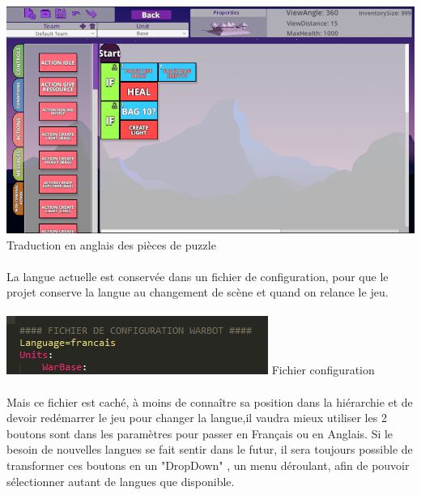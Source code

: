 \documentclass{report}
\begin{document}
\paragraph{}
\begin{center}
\includegraphics[scale=0.5]{DATA/piecetrad.png}
 {Traduction en anglais des pièces de puzzle}
\end{center}
\paragraph{}


La langue actuelle est conservée dans un fichier de configuration, pour que le projet conserve la langue au changement de scène et quand on relance le jeu.

\paragraph{}
\begin{center}
\includegraphics[scale=0.9]{DATA/fichierconfig.png}
 {Fichier configuration}
\end{center}
\paragraph{}

Mais ce fichier est caché, à moins de connaître sa position dans la hiérarchie et de devoir redémarrer le jeu pour changer la langue,il vaudra mieux utiliser les 2 boutons sont dans les paramètres pour passer en Français ou en Anglais. Si le besoin de nouvelles langues se fait sentir dans le futur, il sera toujours possible de transformer ces boutons en un "DropDown" , un menu déroulant, afin de pouvoir sélectionner autant de langues que disponible.
\end{document}
